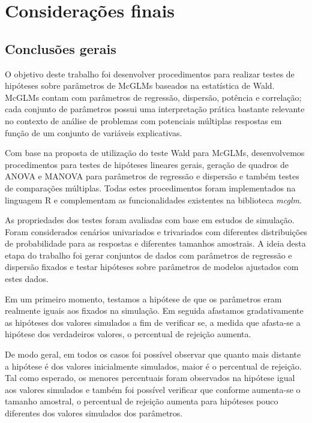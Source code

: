 
\chapter{Considerações finais}\label{cap:conclusao}


\section{Conclusões gerais}

O objetivo deste trabalho foi desenvolver procedimentos para realizar testes de hipóteses sobre parâmetros de McGLMs baseados na estatística de Wald. McGLMs contam com parâmetros de regressão, dispersão, potência e correlação; cada conjunto de parâmetros possui uma interpretação prática bastante relevante no contexto de análise de problemas com potenciais múltiplas respostas em função de um conjunto de variáveis explicativas.

Com base na proposta de utilização do teste Wald para McGLMs, desenvolvemos procedimentos para testes de hipóteses lineares gerais, geração de quadros de ANOVA e MANOVA para parâmetros de regressão e dispersão e também testes de comparações múltiplas. Todas estes procedimentos foram implementados na linguagem R e complementam as funcionalidades existentes na biblioteca \emph{mcglm}.

As propriedades dos testes foram avaliadas com base em estudos de simulação. Foram considerados cenários univariados e trivariados com diferentes distribuições de probabilidade para as respostas e diferentes tamanhos amostrais. A ideia desta etapa do trabalho foi gerar conjuntos de dados com parâmetros de regressão e dispersão fixados e testar hipóteses sobre parâmetros de modelos ajustados com estes dados. 

Em um primeiro momento, testamos a hipótese de que os parâmetros eram realmente iguais aos fixados na simulação. Em seguida afastamos gradativamente as hipóteses dos valores simulados a fim de verificar se, a medida que afasta-se a hipótese dos verdadeiros valores, o percentual de rejeição aumenta. 

De modo geral, em todos os casos foi possível observar que quanto mais distante a hipótese é dos valores inicialmente simulados, maior é o percentual de rejeição. Tal como esperado, os menores percentuais foram observados na hipótese igual aos valores simulados e também foi possível verificar que conforme aumenta-se o tamanho amostral, o percentual de rejeição aumenta para hipóteses pouco diferentes dos valores simulados dos parâmetros.

